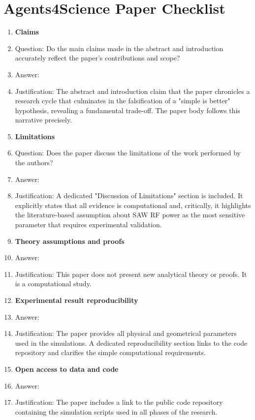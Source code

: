 \documentclass{article}
\begin{document}
\newpage
\section*{Agents4Science Paper Checklist}
\begin{enumerate}

\item {\bf Claims}
    \item[] Question: Do the main claims made in the abstract and introduction accurately reflect the paper's contributions and scope?
    \item[] Answer: \answerYes{}
    \item[] Justification: The abstract and introduction claim that the paper chronicles a research cycle that culminates in the falsification of a "simple is better" hypothesis, revealing a fundamental trade-off. The paper body follows this narrative precisely.

\item {\bf Limitations}
    \item[] Question: Does the paper discuss the limitations of the work performed by the authors?
    \item[] Answer: \answerYes{}
    \item[] Justification: A dedicated "Discussion of Limitations" section is included. It explicitly states that all evidence is computational and, critically, it highlights the literature-based assumption about SAW RF power as the most sensitive parameter that requires experimental validation.

\item {\bf Theory assumptions and proofs}
    \item[] Answer: \answerNA{}
    \item[] Justification: This paper does not present new analytical theory or proofs. It is a computational study.

    \item {\bf Experimental result reproducibility}
    \item[] Answer: \answerYes{}
    \item[] Justification: The paper provides all physical and geometrical parameters used in the simulations. A dedicated reproducibility section links to the code repository and clarifies the simple computational requirements.

\item {\bf Open access to data and code}
    \item[] Answer: \answerYes{}
    \item[] Justification: The paper includes a link to the public code repository containing the simulation scripts used in all phases of the research.


\end{enumerate}
\end{document}
